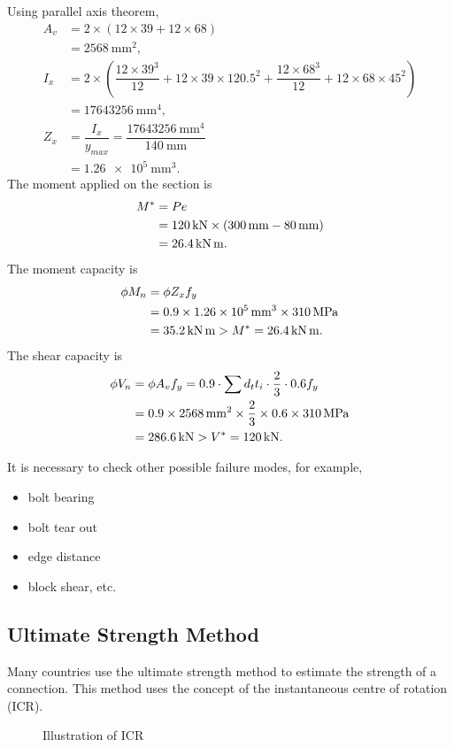 \begin{solution}
\begin{figure}[H]

\end{figure}
Using parallel axis theorem,
\begin{align*}
A_v&=2\times\left(12\times39+12\times68\right)\\
&=\SI{2568}{\mm^2},\\
I_x&=2\times\left(\dfrac{12\times39^3}{12}+12\times39\times120.5^2+\dfrac{12\times68^3}{12}+12\times68\times45^2\right)\\
&=\SI{17643256}{\mm^4},\\
Z_x&=\dfrac{I_x}{y_{max}}=\dfrac{\SI{17643256}{\mm^4}}{\SI{140}{\mm}}\\&=\SI{1.26e5}{\mm^3}.
\end{align*}
The moment applied on the section is
\begin{align*}
M^*&=Pe\\&=\SI{120}{\kilo\newton}\times\left(\SI{300}{\milli\meter}-\SI{80}{\milli\meter}\right)\\&=\SI{26.4}{\kilo\newton\meter}.
\end{align*}
The moment capacity is
\begin{align*}
\phi{}M_n&=\phi{}Z_xf_y\\&=0.9\times\SI{1.26e5}{\milli\meter^3}\times\SI{310}{\mega\pascal}\\&=\SI{35.2}{\kilo\newton\meter}>M^*=\SI{26.4}{\kilo\newton\meter}.
\end{align*}
The shear capacity is
\begin{align*}
\phi{}V_n&=\phi{}A_vf_y=0.9\cdot\sum{}d_tt_i\cdot\dfrac{2}{3}\cdot0.6f_y\\
&=0.9\times\SI{2568}{\milli\meter^2}\times\dfrac{2}{3}\times0.6\times\SI{310}{\mega\pascal}\\
&=\SI{286.6}{\kilo\newton}>V^*=\SI{120}{\kilo\newton}.
\end{align*}

It is necessary to check other possible failure modes, for example,
\begin{itemize}
\item bolt bearing
\item bolt tear out
\item edge distance
\item block shear, etc.
\end{itemize}
\end{solution}
\subsection{Ultimate Strength Method}
Many countries use the ultimate strength method to estimate the strength of a connection. This method uses the concept of the instantaneous centre of rotation (ICR).
\begin{figure}[H]
\centering\caption{Illustration of ICR}
\end{figure}

